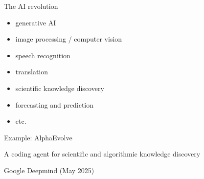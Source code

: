 \begin{frame}{The AI revolution}


    \begin{itemize}
        \item generative AI 
        \vspace{0.5em}
        \item image processing / computer vision
        \vspace{0.5em}
        \item speech recognition
        \vspace{0.5em}
        \item translation
        \vspace{0.5em}
        \item scientific knowledge discovery
        \vspace{0.5em}
        \item forecasting and prediction 
        \vspace{0.5em}
        \item etc.
    \end{itemize}

    
\end{frame}

\begin{frame}{Example: AlphaEvolve} 

    A coding agent for scientific and algorithmic knowledge discovery

    \medskip

    \begin{figure}
       \centering
    \end{figure}

    \begin{center}
        Google Deepmind (May 2025)
    \end{center}

\end{frame}

